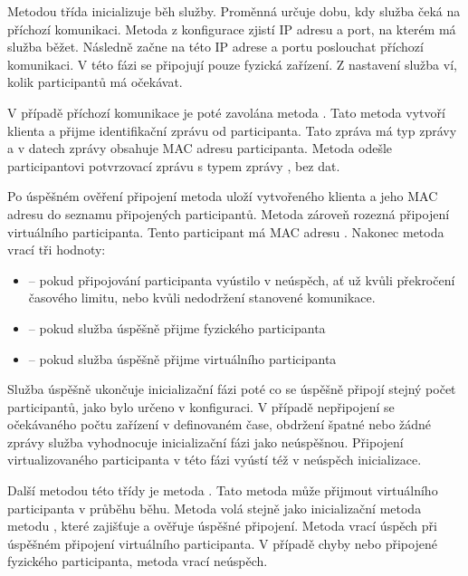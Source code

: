 Metodou  třída inicializuje běh služby. Proměnná  určuje dobu, kdy služba čeká na příchozí komunikaci. Metoda z konfigurace zjistí IP adresu a port, na kterém má služba běžet. Následně začne na této IP adrese a portu poslouchat příchozí komunikaci. V této fázi se připojují pouze fyzická zařízení. Z nastavení služba ví, kolik participantů má očekávat. 

V případě příchozí komunikace je poté zavolána metoda . Tato metoda vytvoří klienta a přijme identifikační zprávu od participanta. Tato zpráva má typ zprávy  a v datech zprávy obsahuje MAC adresu participanta. Metoda odešle participantovi potvrzovací zprávu s typem zprávy , bez dat. 

Po úspěšném ověření připojení metoda uloží vytvořeného klienta a jeho MAC adresu do seznamu připojených participantů. Metoda zároveň rozezná připojení virtuálního participanta. Tento participant má MAC adresu . Nakonec metoda vrací tři hodnoty:
\begin{itemize}
    \item {} -- pokud připojování participanta vyústilo v neúspěch, ať už kvůli překročení časového limitu, nebo kvůli nedodržení stanovené komunikace.
    \item {} -- pokud služba úspěšně přijme fyzického participanta
    \item {} -- pokud služba úspěšně přijme virtuálního participanta
\end{itemize}

Služba úspěšně ukončuje inicializační fázi poté co se úspěšně připojí stejný počet participantů, jako bylo určeno v konfiguraci. V případě nepřipojení se očekávaného počtu zařízení v definovaném čase, obdržení špatné nebo žádné zprávy služba vyhodnocuje inicializační fázi jako neúspěšnou. Připojení virtualizovaného participanta v této fázi vyústí též v neúspěch inicializace.

Další metodou této třídy je metoda . Tato metoda může přijmout virtuálního participanta v průběhu běhu. Metoda volá stejně jako inicializační metoda metodu , které zajišťuje a ověřuje úspěšné připojení. Metoda vrací úspěch při úspěšném připojení virtuálního participanta. V případě chyby nebo připojené fyzického participanta, metoda vrací neúspěch. 

